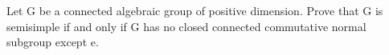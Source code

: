 Let G be a connected algebraic group of positive dimension. Prove that G is semisimple if and only if G has no closed connected commutative normal subgroup except e.
